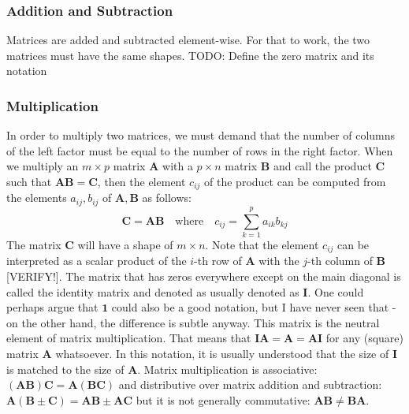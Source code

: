 \subsubsection{Addition and Subtraction}
Matrices are added and subtracted element-wise. For that to work, the two matrices must have the same shapes. TODO: Define the zero matrix and its notation

\subsubsection{Multiplication} In order to multiply two matrices, we must demand that the number of columns of the left factor must be equal to the number of rows in the right factor. When we multiply an $m \times p$ matrix $\mathbf{A}$ with a $p \times n$ matrix $\mathbf{B}$ and call the product $\mathbf{C}$ such that $\mathbf{A} \mathbf{B} = \mathbf{C}$, then the element $c_{ij}$ of the product can be computed from the elements $a_{ij}, b_{ij}$ of $\mathbf{A}, \mathbf{B}$ as follows:
\begin{equation}
 \mathbf{C} = \mathbf{A} \mathbf{B} 
 \quad \text{where} \quad
 c_{ij} = \sum_{k=1}^p a_{ik} b_{kj}
\end{equation}
The matrix $\mathbf{C}$ will have a shape of $m \times n$. Note that the element $c_{ij}$ can be interpreted as a scalar product of the $i$-th row of $\mathbf{A}$ with the $j$-th column of  $\mathbf{B}$ [VERIFY!]. The matrix that has zeros everywhere except on the main diagonal is called the identity matrix and denoted as usually denoted as $\mathbf{I}$. One could perhaps argue that $\mathbf{1}$ could also be a good notation, but I have never seen that - on the other hand, the difference is subtle anyway. This matrix is the neutral element of matrix multiplication. That means that  $\mathbf{I} \mathbf{A} = \mathbf{A} = \mathbf{A} \mathbf{I}$ for any (square) matrix $\mathbf{A}$ whatsoever. In this notation, it is usually understood that the size of $\mathbf{I}$ is matched to the size of $\mathbf{A}$. Matrix multiplication is associative: $(\mathbf{A} \mathbf{B}) \mathbf{C} = \mathbf{A} (\mathbf{B} \mathbf{C})$ and distributive over matrix addition and subtraction: $\mathbf{A} (\mathbf{B} \pm \mathbf{C}) = \mathbf{A} \mathbf{B} \pm \mathbf{A} \mathbf{C}$ but it is not generally commutative: $\mathbf{AB} \neq \mathbf{BA}$. 

